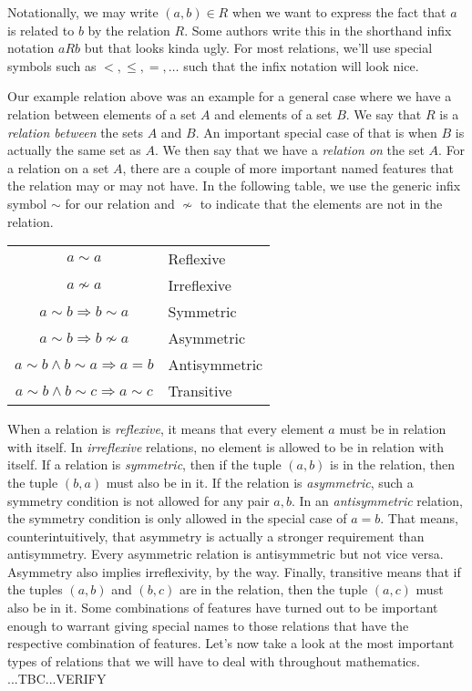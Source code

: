 \medskip
Notationally, we may write $(a,b) \in R$ when we want to express the fact that $a$ is related to $b$ by the relation $R$. Some authors write this in the shorthand infix notation $a R b$ but that looks kinda ugly. For most relations, we'll use special symbols such as $<, \leq, =, \ldots$ such that the infix notation will look nice. 

\medskip
Our example relation above was an example for a general case where we have a relation between elements of a set $A$ and elements of a set $B$. We say that $R$ is a \emph{relation between} the sets $A$ and $B$. An important special case of that is when $B$ is actually the same set as $A$. We then say that we have a \emph{relation on} the set $A$. For a relation on a set $A$, there are a couple of more important named features that the relation may or may not have. In the following table, we use the generic infix symbol $\sim$ for our relation and $\nsim$ to indicate that the elements are not in the relation. 

\medskip
\begin{tabular}{c l}
\label{Tab:RelationFeatures}
  $a \sim a$                                       & Reflexive     \\
  $a \nsim a$                                      & Irreflexive   \\
  $a \sim b \Rightarrow b \sim a$                  & Symmetric     \\
  $a \sim b \Rightarrow b \nsim a$                 & Asymmetric    \\
  $a \sim b \wedge b \sim a \Rightarrow a = b $    & Antisymmetric \\
  $a \sim b \wedge b \sim c \Rightarrow a \sim c$  & Transitive    
\end{tabular}
\medskip

When a relation is \emph{reflexive}, it means that every element $a$ must be in relation with itself. In \emph{irreflexive} relations, no element is allowed to be in relation with itself. If a relation is \emph{symmetric}, then if the tuple $(a,b)$ is in the relation, then the tuple $(b,a)$ must also be in it. If the relation is \emph{asymmetric}, such a symmetry condition is not allowed for any pair $a,b$. In an \emph{antisymmetric} relation, the symmetry condition is only allowed in the special case of $a = b$. That means, counterintuitively, that asymmetry is actually a stronger requirement than antisymmetry. Every asymmetric relation is antisymmetric but not vice versa. Asymmetry also implies irreflexivity, by the way. Finally, transitive means that if the tuples $(a,b)$ and $(b,c)$ are in the relation, then the tuple $(a,c)$ must also be in it. Some combinations of features have turned out to be important enough to warrant giving special names to those relations that have the respective combination of features. Let's now take a look at the most important types of relations that we will have to deal with throughout mathematics. ...TBC...VERIFY

